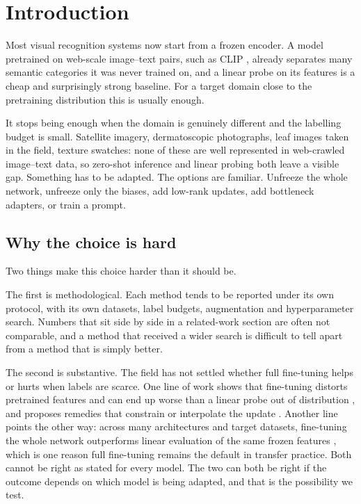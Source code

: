\documentclass[preprint,12pt]{elsarticle}
\begin{document}
\section{Introduction}

Most visual recognition systems now start from a frozen encoder. A model
pretrained on web-scale image--text pairs, such as CLIP \cite{radford2021clip},
already separates many semantic categories it was never trained on, and a linear
probe on its features is a cheap and surprisingly strong baseline. For a target
domain close to the pretraining distribution this is usually enough.

It stops being enough when the domain is genuinely different and the labelling
budget is small. Satellite imagery, dermatoscopic photographs, leaf images taken
in the field, texture swatches: none of these are well represented in web-crawled
image--text data, so zero-shot inference and linear probing both leave a visible
gap. Something has to be adapted. The options are familiar. Unfreeze the whole
network, unfreeze only the biases, add low-rank updates, add bottleneck adapters,
or train a prompt.

\subsection{Why the choice is hard}

Two things make this choice harder than it should be.

The first is methodological. Each method tends to be reported under its own
protocol, with its own datasets, label budgets, augmentation and hyperparameter
search. Numbers that sit side by side in a related-work section are often not
comparable, and a method that received a wider search is difficult to tell apart
from a method that is simply better.

The second is substantive. The field has not settled whether full fine-tuning
helps or hurts when labels are scarce. One line of work shows that fine-tuning
distorts pretrained features and can end up worse than a linear probe out of
distribution \cite{kumar2022finetuning}, and proposes remedies that constrain or
interpolate the update \cite{wortsman2022wiseft}. Another line points the other
way: across many architectures and target datasets, fine-tuning the whole network
outperforms linear evaluation of the same frozen features
\cite{kornblith2019transfer}, which is one reason full fine-tuning remains the
default in transfer practice. Both cannot be right as stated for every model. The
two can both be right if the outcome depends on which model is being adapted, and
that is the possibility we test.
\end{document}
